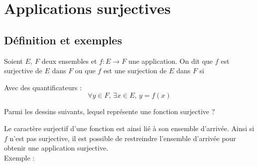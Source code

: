 \documentclass[a4paper, 11pt]{article}
\begin{document}
%
%
%
% 
\section{Applications surjectives}

\subsection{D\'efinition et exemples}


\begin{defi} Soient $E,\ F$ deux ensembles et $f: E\rightarrow F$ une application.
	On dit que $f$ est surjective de $E$ dans $F$ ou que $f$ est une surjection de $E$ dans $F$ si
\end{defi}

Avec des quantificateurs :
$$\forall  y \in F, \, \exists x\in E, \,  y=f(x)$$




\begin{exemple}
	Parmi les dessins suivants, lequel repr\'esente une fonction surjective ?

\end{exemple}




\begin{rem}
	Le caract\`{e}re surjectif d'une fonction est ainsi li\'e \`{a} son ensemble d'arriv\'ee. Ainsi si $f$ n'est pas surjective, il est possible de restreindre l'ensemble d'arriv\'ee pour obtenir une application surjective.\\
	Exemple :
\end{rem}
\end{document}
